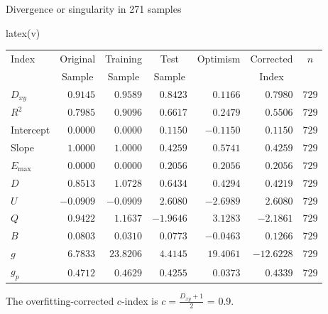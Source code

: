 Divergence or singularity in 271 samples
\begin{Sinput}
latex(v)
\end{Sinput}
\Needspace{2in}
\begin{center}\normalsize
\begin{tabular}{lrrrrrr}
\hline\hline
\multicolumn{1}{l}{Index}&\multicolumn{1}{c}{Original}&\multicolumn{1}{c}{Training}&\multicolumn{1}{c}{Test}&\multicolumn{1}{c}{Optimism}&\multicolumn{1}{c}{Corrected}&\multicolumn{1}{c}{$n$}\tabularnewline
&\multicolumn{1}{c}{{\normalsize Sample}}&\multicolumn{1}{c}{{\normalsize Sample}}&\multicolumn{1}{c}{{\normalsize Sample}}&&\multicolumn{1}{c}{{\normalsize Index}}&\tabularnewline
\hline
$D_{xy}$&$ 0.9145$&$ 0.9589$&$ 0.8423$&$ 0.1166$&$  0.7980$&$729$\tabularnewline
$R^{2}$&$ 0.7985$&$ 0.9096$&$ 0.6617$&$ 0.2479$&$  0.5506$&$729$\tabularnewline
Intercept&$ 0.0000$&$ 0.0000$&$ 0.1150$&$-0.1150$&$  0.1150$&$729$\tabularnewline
Slope&$ 1.0000$&$ 1.0000$&$ 0.4259$&$ 0.5741$&$  0.4259$&$729$\tabularnewline
$E_{\max}$&$ 0.0000$&$ 0.0000$&$ 0.2056$&$ 0.2056$&$  0.2056$&$729$\tabularnewline
$D$&$ 0.8513$&$ 1.0728$&$ 0.6434$&$ 0.4294$&$  0.4219$&$729$\tabularnewline
$U$&$-0.0909$&$-0.0909$&$ 2.6080$&$-2.6989$&$  2.6080$&$729$\tabularnewline
$Q$&$ 0.9422$&$ 1.1637$&$-1.9646$&$ 3.1283$&$ -2.1861$&$729$\tabularnewline
$B$&$ 0.0803$&$ 0.0310$&$ 0.0773$&$-0.0463$&$  0.1266$&$729$\tabularnewline
$g$&$ 6.7833$&$23.8206$&$ 4.4145$&$19.4061$&$-12.6228$&$729$\tabularnewline
$g_{p}$&$ 0.4712$&$ 0.4629$&$ 0.4255$&$ 0.0373$&$  0.4339$&$729$\tabularnewline
\hline
\end{tabular}
\end{center}

The overfitting-corrected $c$-index is $c = \frac{D_{xy} + 1}{2}$ = 0.9.

